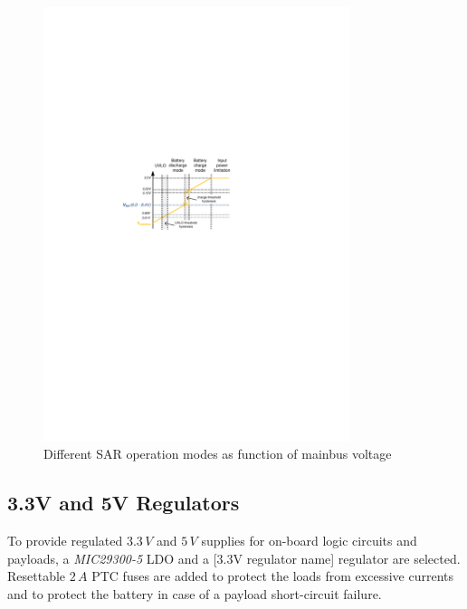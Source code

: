 \begin{figure}[H]
\centering
\includegraphics[width=0.8\textwidth]{figures/fig_CDR_SAR_ModeTransition}
\caption{Different SAR operation modes as function of mainbus voltage}
\label{fig:SAR_ModeTransition}
\end{figure}%
%
%
\subsection{3.3V and 5V Regulators}
To provide regulated $3.3\,V$ and $5\,V$ supplies for on-board logic circuits and payloads, a \textit{MIC29300-5} \ac{LDO} and a [3.3V regulator name] regulator are selected. Resettable $2\,A$ \ac{PTC} fuses are added to protect the loads from excessive currents and to protect the battery in case of a payload short-circuit failure.
%
